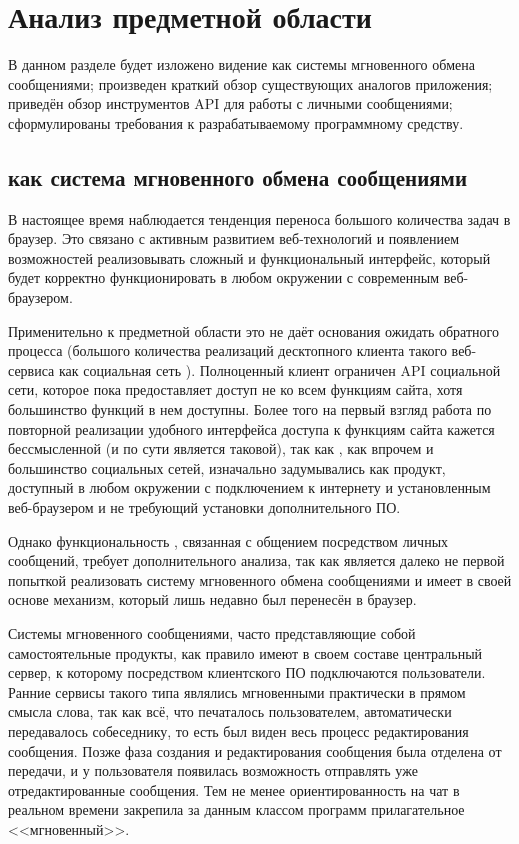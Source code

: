 \section{Анализ предметной области}

В данном разделе будет изложено видение \vk{} как системы мгновенного обмена
сообщениями; произведен краткий обзор существующих аналогов приложения; приведён
обзор инструментов \vk{} API для работы с личными сообщениями; сформулированы
требования к разрабатываемому программному средству.

\subsection{\vk{} как система мгновенного обмена сообщениями}

В настоящее время наблюдается тенденция переноса большого количества задач в
браузер. Это связано с активным развитием веб-технологий и появлением
возможностей реализовывать сложный и функциональный интерфейс, который будет
корректно функционировать в любом окружении с современным веб-браузером.

Применительно к предметной области это не даёт основания ожидать обратного
процесса (большого количества реализаций десктопного клиента такого веб-сервиса
как социальная сеть \vk{}). Полноценный клиент ограничен API социальной сети,
которое пока предоставляет доступ не ко всем функциям сайта, хотя большинство
функций в нем доступны. Более того на первый взгляд работа по повторной
реализации удобного интерфейса доступа к функциям сайта кажется бессмысленной (и
по сути является таковой), так как \vk{}, как впрочем и большинство социальных
сетей, изначально задумывались как продукт, доступный в любом окружении с
подключением к интернету и установленным веб-браузером и не требующий установки
дополнительного ПО.

Однако функциональность \vk{}, связанная с общением посредством личных
сообщений, требует дополнительного анализа, так как является далеко не первой
попыткой реализовать систему мгновенного обмена сообщениями и имеет в своей
основе механизм, который лишь недавно был перенесён в браузер.

Системы мгновенного сообщениями, часто представляющие собой самостоятельные
продукты, как правило имеют в своем составе центральный сервер, к которому
посредством клиентского ПО подключаются пользователи. Ранние сервисы такого типа
являлись мгновенными практически в прямом смысла слова, так как всё, что
печаталось пользователем, автоматически передавалось собеседнику, то есть был
виден весь процесс редактирования сообщения. Позже фаза создания и
редактирования сообщения была отделена от передачи, и у пользователя появилась
возможность отправлять уже отредактированные сообщения. Тем не менее
ориентированность на чат в реальном времени закрепила за данным классом программ
прилагательное <<мгновенный>>.

